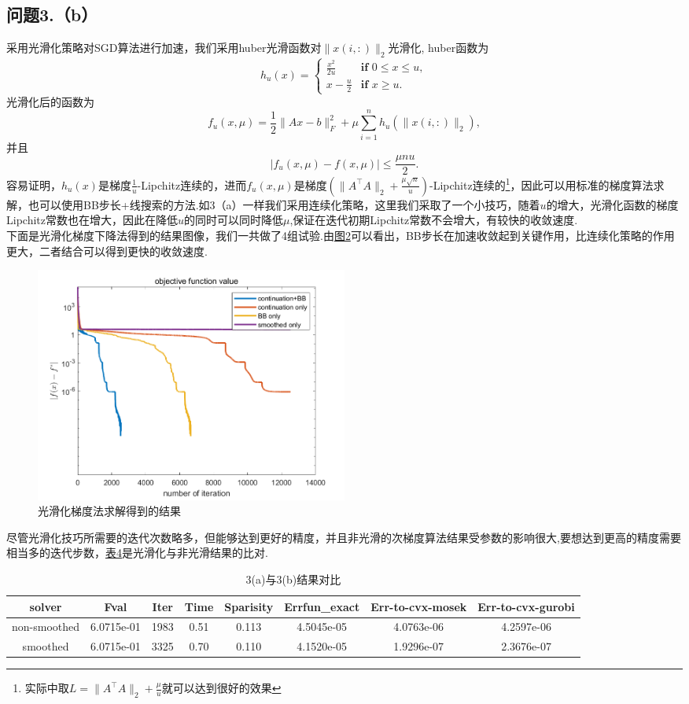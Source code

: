 \documentclass[10pt,a4paper]{article}
\begin{document}
\subsection{问题3.（b）}
\indent 采用光滑化策略对SGD算法进行加速，我们采用huber光滑函数对$\|x(i,:)\|_{2}$光滑化, huber函数为
$$h_{u}(x)=\begin{cases}
	\frac{x^{2}}{2u} & \textbf{if }0\leq x\leq u,\\
	x-\frac{u}{2}  &\textbf{if }x\geq u.
\end{cases}
$$
光滑化后的函数为
$$f_{u}(x,\mu)=\frac{1}{2}\|Ax-b\|_{F}^{2}+\mu\sum\limits_{i=1}^{n}h_{u}(\|x(i,:)\|_{2}),$$
并且
$$
	|f_{u}(x,\mu)-f(x,\mu)|\leq \frac{\mu nu}{2}.
$$
容易证明，$h_{u}(x)$是梯度$\frac{1}{u}$-Lipchitz连续的，进而$f_{u}(x,\mu)$是梯度$(\|A^{\top}A\|_{2}+\frac{\mu\sqrt{n}}{u})$-Lipchitz连续的\footnote{实际中取$L=\|A^{\top}A\|_{2}+\frac{\mu}{u}$就可以达到很好的效果}，因此可以用标准的梯度算法求解，也可以使用BB步长+线搜索的方法.如3（a）一样我们采用连续化策略，这里我们采取了一个小技巧，随着$u$的增大，光滑化函数的梯度Lipchitz常数也在增大，因此在降低$u$的同时可以同时降低$\mu$,保证在迭代初期Lipchitz常数不会增大，有较快的收敛速度.\\
\indent	下面是光滑化梯度下降法得到的结果图像，我们一共做了4组试验.由\hyperref[10]{图2}可以看出，BB步长在加速收敛起到关键作用，比连续化策略的作用更大，二者结合可以得到更快的收敛速度.
\begin{figure}[ht]
	\centering
	\includegraphics[width=0.5\textwidth]{figure.3(b).png}
	\caption{光滑化梯度法求解得到的结果}
	\label{10}
\end{figure}
尽管光滑化技巧所需要的迭代次数略多，但能够达到更好的精度，并且非光滑的次梯度算法结果受参数的影响很大,要想达到更高的精度需要相当多的迭代步数，\hyperref[11]{表4}是光滑化与非光滑结果的比对.
\begin{table}[h]
	\centering
	\begin{tabular}{|c|c|c|c|c|c|c|c|}
		\hline
		solver& Fval&Iter  &Time&Sparisity& Errfun\_exact &Err-to-cvx-mosek&Err-to-cvx-gurobi\\
		\hline
		non-smoothed&6.0715e-01&1983&0.51&0.113&4.5045e-05&4.0763e-06&4.2597e-06\\
		\hline
		smoothed&6.0715e-01&3325&0.70&0.110&4.1520e-05&1.9296e-07&2.3676e-07\\
		\hline
	\end{tabular}
	\caption{3(a)与3(b)结果对比}
	\label{11}
\end{table}
\end{document}
